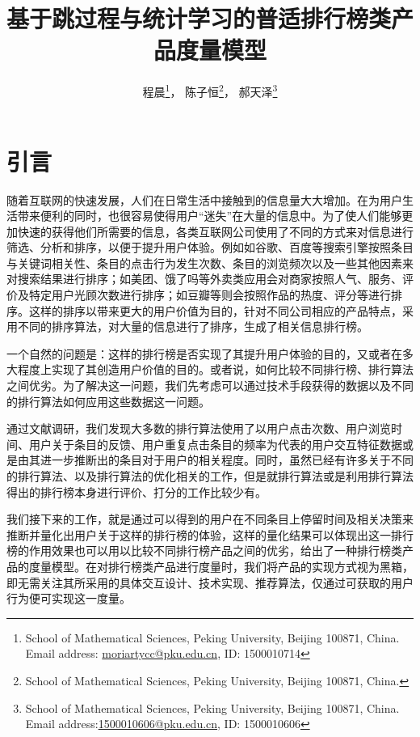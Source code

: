 \documentclass[UTF8]{ctexart}
\theoremstyle{plain}
\theoremstyle{definition}
\theoremstyle{remark}
\begin{document}
	\setcounter{footnote}{1}
	\title{基于跳过程与统计学习的普适排行榜类产品度量模型}
	\author{程晨\footnote{School of Mathematical Sciences, Peking University, Beijing 100871, China. Email address:
			\href{mailto:moriartycc@pku.edu.cn}{moriartycc@pku.edu.cn}, ID: 1500010714}， \quad 陈子恒\footnote{School of Mathematical Sciences, Peking University, Beijing 100871, China. }， \quad 郝天泽\footnote{School of Mathematical Sciences, Peking University, Beijing 100871, China. Email address:\href{mailto:1500010606@pku.edu.cn}{1500010606@pku.edu.cn}, ID: 1500010606}}
	\date{}
	\maketitle
	\newpage
	\tableofcontents
	\newpage
	\section{引言}
    随着互联网的快速发展，人们在日常生活中接触到的信息量大大增加。在为用户生活带来便利的同时，也很容易使得用户“迷失”在大量的信息中。为了使人们能够更加快速的获得他们所需要的信息，各类互联网公司使用了不同的方式来对信息进行筛选、分析和排序，以便于提升用户体验。例如如谷歌、百度等搜索引擎按照条目与关键词相关性、条目的点击行为发生次数、条目的浏览频次以及一些其他因素来对搜索结果进行排序；如美团、饿了吗等外卖类应用会对商家按照人气、服务、评价及特定用户光顾次数进行排序；如豆瓣等则会按照作品的热度、评分等进行排序。这样的排序以带来更大的用户价值为目的，针对不同公司相应的产品特点，采用不同的排序算法，对大量的信息进行了排序，生成了相关信息排行榜。

    一个自然的问题是：这样的排行榜是否实现了其提升用户体验的目的，又或者在多大程度上实现了其创造用户价值的目的。或者说，如何比较不同排行榜、排行算法之间优劣。为了解决这一问题，我们先考虑可以通过技术手段获得的数据以及不同的排行算法如何应用这些数据这一问题。

    通过文献调研\cite{agichtein2006improving}\cite{barrett2009enhanced}\cite{nematzadeh2017algorithmic}\cite{nie2005object}\cite{zehlike2017fa}，我们发现大多数的排行算法使用了以用户点击次数、用户浏览时间、用户关于条目的反馈、用户重复点击条目的频率为代表的用户交互特征数据或是由其进一步推断出的条目对于用户的相关程度。同时，虽然已经有许多关于不同的排行算法、以及排行算法的优化相关的工作，但是就排行算法或是利用排行算法得出的排行榜本身进行评价、打分的工作比较少有。

    我们接下来的工作，就是通过可以得到的用户在不同条目上停留时间及相关决策来推断并量化出用户关于这样的排行榜的体验，这样的量化结果可以体现出这一排行榜的作用效果也可以用以比较不同排行榜产品之间的优劣，给出了一种排行榜类产品的度量模型。在对排行榜类产品进行度量时，我们将产品的实现方式视为黑箱，即无需关注其所采用的具体交互设计、技术实现、推荐算法，仅通过可获取的用户行为便可实现这一度量。
\end{document}
